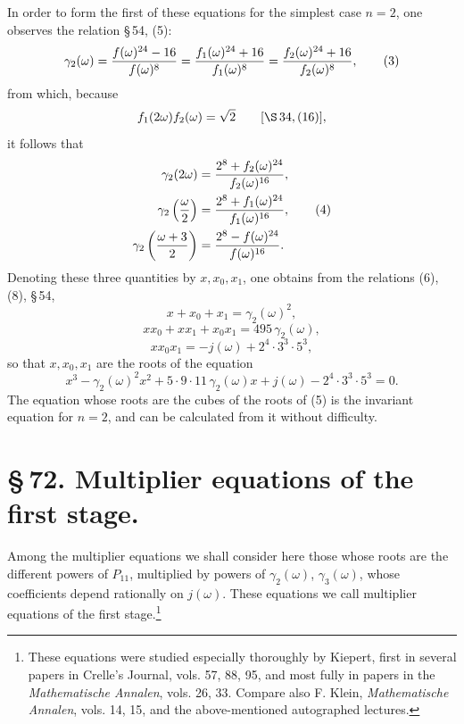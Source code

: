 \documentclass[11pt]{article}
\begin{document}
In order to form the first of these equations for the simplest case $n=2$, one observes the relation \S\,54, (5):
\begin{equation}
 \gamma_2(\omega)={f(\omega)^{24}-16\over f(\omega)^8}
 ={f_1(\omega)^{24}+16\over f_1(\omega)^8}
 ={f_2(\omega)^{24}+16\over f_2(\omega)^8},
\tag{3}
\end{equation}
from which, because
\[
 f_1(2\omega)f_2(\omega)=\sqrt{2}
 \qquad [\S\,34,(16)],
\]
it follows that
\begin{align}
\gamma_2(2\omega)&={2^8+f_2(\omega)^{24}\over f_2(\omega)^{16}},\notag\\
\gamma_2\left({\omega\over2}\right)&={2^8+f_1(\omega)^{24}\over f_1(\omega)^{16}},\tag{4}\\
\gamma_2\left({\omega+3\over2}\right)&={2^8-f(\omega)^{24}\over f(\omega)^{16}}.\notag
\end{align}
Denoting these three quantities by $x,x_0,x_1$, one obtains from the relations (6), (8), \S\,54,
\[
 x+x_0+x_1=\gamma_2(\omega)^2,
\]
\[
 xx_0+xx_1+x_0x_1=495\,\gamma_2(\omega),
\]
\[
 xx_0x_1=-j(\omega)+2^4\cdot 3^3\cdot 5^3,
\]
so that $x,x_0,x_1$ are the roots of the equation
\begin{equation}
 x^3-\gamma_2(\omega)^2x^2+5\cdot9\cdot11\,\gamma_2(\omega)x+j(\omega)-2^4\cdot3^3\cdot5^3=0.
\tag{5}
\end{equation}
The equation whose roots are the cubes of the roots of (5) is the invariant equation for $n=2$, and can be calculated from it without difficulty.

\section*{\S\,72. Multiplier equations of the first stage.}

Among the multiplier equations we shall consider here those whose roots are the different powers of $P_{11}$, multiplied by powers of $\gamma_2(\omega)$, $\gamma_3(\omega)$, whose coefficients depend rationally on $j(\omega)$. These equations we call multiplier equations of the first stage.\footnote{These equations were studied especially thoroughly by Kiepert, first in several papers in Crelle's Journal, vols. 57, 88, 95, and most fully in papers in the \emph{Mathematische Annalen}, vols. 26, 33. Compare also F. Klein, \emph{Mathematische Annalen}, vols. 14, 15, and the above-mentioned autographed lectures.}
\end{document}
